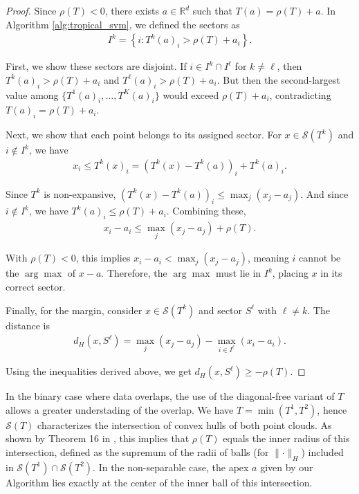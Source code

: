 \documentclass{article}
\renewcommand{\geq}{\geqslant}
\renewcommand{\leq}{\leqslant}
\newcommand{\R}{\mathbb{R}}
\begin{document}
\begin{proof}
Since $\rho(T) < 0$, there exists $a \in \R^d$ such that $T(a) = \rho(T) + a$. In Algorithm \ref{alg:tropical_svm}, we defined the sectors as
\begin{align}
I^k = \left\{i : T^k(a)_i > \rho(T) + a_i\right\}.
\end{align}

First, we show these sectors are disjoint. If $i \in I^k \cap I^{\ell}$ for $k \neq \ell$, then $T^k(a)_i > \rho(T) + a_i$ and $T^{\ell}(a)_i > \rho(T) + a_i$. But then the second-largest value among $\{T^1(a)_i,\ldots,T^K(a)_i\}$ would exceed $\rho(T) + a_i$, contradicting $T(a)_i = \rho(T) + a_i$.

Next, we show that each point belongs to its assigned sector. For $x \in \mathcal{S}(T^k)$ and $i \not\in I^k$, we have
\begin{align}
x_i \leq T^k(x)_i = (T^k(x) - T^k(a))_i + T^k(a)_i.
\end{align}

Since $T^k$ is non-expansive, $(T^k(x) - T^k(a))_i \leq \max_j(x_j - a_j)$. And since $i \not\in I^k$, we have $T^k(a)_i \leq \rho(T) + a_i$. Combining these,
\begin{align}
x_i - a_i \leq \max_j(x_j - a_j) + \rho(T).
\end{align}

With $\rho(T) < 0$, this implies $x_i - a_i < \max_j(x_j - a_j)$, meaning $i$ cannot be the $\arg\max$ of $x - a$. Therefore, the $\arg\max$ must lie in $I^k$, placing $x$ in its correct sector.

Finally, for the margin, consider $x \in \mathcal{S}(T^k)$ and sector $S^{\ell}$ with $\ell \neq k$. The distance is 
\begin{align}
d_H(x, S^{\ell}) = \max_j(x_j - a_j) - \max_{i \in I^{\ell}}(x_i - a_i).
\end{align}

Using the inequalities derived above, we get $d_H(x, S^{\ell}) \geq -\rho(T)$.
\end{proof}

In the binary case where data overlaps, the use of the diagonal-free variant of $T$ allows a greater understading of the overlap. We have $T = \min(T^1, T^2)$, hence $\mathcal{S}(T)$ characterizes the intersection of convex hulls of both point clouds. As shown by Theorem 16 in \cite{allamigeon_condition}, this implies that $\rho(T)$ equals the inner radius of this intersection, defined as the supremum of the radii of balls (for $\lVert\cdot\rVert_H$) included in $\mathcal{S}(T^1) \cap \mathcal{S}(T^2)$. In the non-separable case, the apex $a$ given by our Algorithm lies exactly at the center of the inner ball of this intersection.
\end{document}
